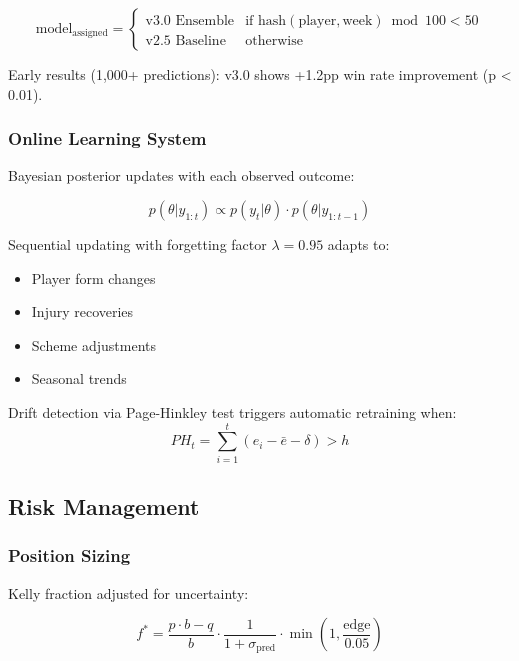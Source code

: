 \begin{equation}
\text{model}_{\text{assigned}} = \begin{cases}
\text{v3.0 Ensemble} & \text{if } \text{hash}(\text{player}, \text{week}) \bmod 100 < 50 \\
\text{v2.5 Baseline} & \text{otherwise}
\end{cases}
\end{equation}

Early results (1,000+ predictions): v3.0 shows +1.2pp win rate improvement (p < 0.01).

\subsubsection{Online Learning System}

Bayesian posterior updates with each observed outcome:

\begin{equation}
p(\theta | y_{1:t}) \propto p(y_t | \theta) \cdot p(\theta | y_{1:t-1})
\end{equation}

Sequential updating with forgetting factor $\lambda = 0.95$ adapts to:
\begin{itemize}
  \item Player form changes
  \item Injury recoveries
  \item Scheme adjustments
  \item Seasonal trends
\end{itemize}

Drift detection via Page-Hinkley test triggers automatic retraining when:
\begin{equation}
PH_t = \sum_{i=1}^t (e_i - \bar{e} - \delta) > h
\end{equation}

\subsection{Risk Management}

\subsubsection{Position Sizing}

Kelly fraction adjusted for uncertainty:

\begin{equation}
f^* = \frac{p \cdot b - q}{b} \cdot \frac{1}{1 + \sigma_{\text{pred}}} \cdot \min\left(1, \frac{\text{edge}}{0.05}\right)
\end{equation}

